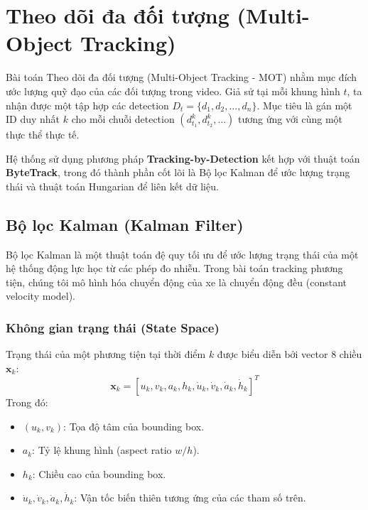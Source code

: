 \section{Theo dõi đa đối tượng (Multi-Object Tracking)}
\label{sec:tracking_theory}

Bài toán Theo dõi đa đối tượng (Multi-Object Tracking - MOT) nhằm mục đích ước lượng quỹ đạo của các đối tượng trong video. Giả sử tại mỗi khung hình $t$, ta nhận được một tập hợp các detection $D_t = \{d_1, d_2, \dots, d_n\}$. Mục tiêu là gán một ID duy nhất $k$ cho mỗi chuỗi detection $(d_{t_1}^k, d_{t_2}^k, \dots)$ tương ứng với cùng một thực thể thực tế.

Hệ thống sử dụng phương pháp \textbf{Tracking-by-Detection} kết hợp với thuật toán \textbf{ByteTrack}, trong đó thành phần cốt lõi là Bộ lọc Kalman để ước lượng trạng thái và thuật toán Hungarian để liên kết dữ liệu.

\subsection{Bộ lọc Kalman (Kalman Filter)}
Bộ lọc Kalman là một thuật toán đệ quy tối ưu để ước lượng trạng thái của một hệ thống động lực học từ các phép đo nhiễu. Trong bài toán tracking phương tiện, chúng tôi mô hình hóa chuyển động của xe là chuyển động đều (constant velocity model).

\subsubsection{Không gian trạng thái (State Space)}
Trạng thái của một phương tiện tại thời điểm $k$ được biểu diễn bởi vector 8 chiều $\mathbf{x}_k$:
\begin{equation}
    \mathbf{x}_k = [u_k, v_k, a_k, h_k, \dot{u}_k, \dot{v}_k, \dot{a}_k, \dot{h}_k]^T
\end{equation}
Trong đó:
\begin{itemize}
    \item $(u_k, v_k)$: Tọa độ tâm của bounding box.
    \item $a_k$: Tỷ lệ khung hình (aspect ratio $w/h$).
    \item $h_k$: Chiều cao của bounding box.
    \item $\dot{u}_k, \dot{v}_k, \dot{a}_k, \dot{h}_k$: Vận tốc biến thiên tương ứng của các tham số trên.
\end{itemize}

